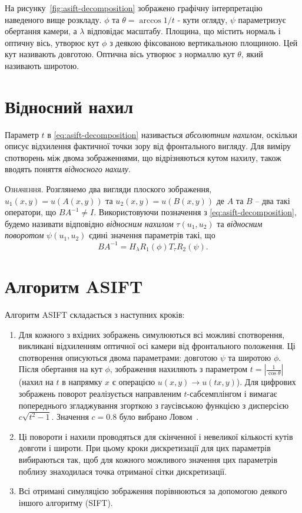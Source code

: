 
На рисунку~\ref{fig:asift-decomposition} зображено графічну інтерпретацію наведеного вище розкладу. $\phi$ та $\theta= \arccos1/t$ - кути огляду, $\psi$ параметризує обертання камери, а $\lambda$ відповідає масштабу. Площина, що містить нормаль і оптичну вісь, утворює кут $\phi$ з деякою фіксованою вертикальною площиною. Цей кут називають довготою. Оптична вісь утворює з нормаллю кут $\theta$, який називають широтою. 

\section{Відносний нахил}

Параметр $t$ в \ref{eq:asift-decomposition} називається \textit{абсолютним нахилом}, оскільки описує відхилення фактичної точки зору від фронтального вигляду. Для виміру спотворень між двома зображеннями, що відрізняються кутом нахилу, також вводять поняття \textit{відносного нахилу}.

\textsc{Означення}. Розглянемо два вигляди плоского зображення, $u_1(x,y) = u(A(x,y))$ та $u_2(x,y)=u(B(x,y))$ де $A$ та $B$ -- два такі оператори, що $BA^{-1} \ne I$. Використовуючи позначення з \ref{eq:asift-decomposition}, будемо називати відповідно \textit{відносним нахилом} $\tau(u_1,u_2)$ та \textit{відносним поворотом} $\psi(u_1,u_2)$ єдині значення параметрів такі, що 
\[
  BA^{-1} = H_\lambda R_1(\phi)T_\tau R_2(\psi).
\]

\section{Алгоритм ASIFT}
\label{sec:algo-asift}
Алгоритм ASIFT складається з наступних кроків:

\begin{enumerate}
    \item Для кожного з вхідних зображень симулюються всі можливі спотворення, викликані відхиленням оптичної осі камери від фронтального положення. Ці спотворення описуються двома параметрами: довготою $\psi$ та широтою $\phi$. Після обертання на кут $\phi$, зображення нахиляють з параметром $t = \left| \frac{1}{\cos\theta}\right|$ (нахил на $t$ в напрямку $x$ є операцією $u(x,y) \rightarrow u(tx,y)$). Для цифрових зображень поворот реалізується направленим $t$-сабсемплінгом і вимагає попереднього згладжування згорткою з гаусівською функцією з дисперсією $c\sqrt{t^2-1}$. Значення $c=0.8$ було вибрано Ловом~\cite{Lowe2004}.
    \item Ці повороти і нахили проводяться для скінченної і невеликої кількості кутів довготи і широти. При цьому кроки дискретизації для цих параметрів вибираються так, щоб для кожного можливого значення цих параметрів поблизу знаходилася точка отриманої сітки дискретизації.
    \item Всі отримані симуляцією зображення порівнюються за допомогою деякого іншого алгоритму (SIFT).
\end{enumerate}

